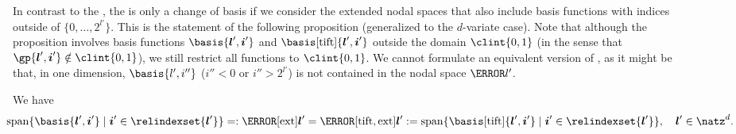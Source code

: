 In contrast to the \hftr, the \tiftr is only a change of basis
if we consider the extended nodal spaces that also include
basis functions with indices outside of $\{0, \dotsc, 2^{l'}\}$.
This is the statement of the following proposition
(generalized to the $d$-variate case).
Note that although the proposition involves basis functions
$\basis{\*l',\*i'}$ and $\basis[\tift]{\*l',\*i'}$
outside the domain $\clint{0, 1}$
(in the sense that $\gp{\*l',\*i'} \notin \clint{0, 1}$),
we still restrict all functions to $\clint{0, 1}$.
We cannot formulate an equivalent version of ,
as it might be that, in one dimension,
$\basis{l',i''}$ ($i'' < 0$ or $i'' > 2^{l'}$)
is not contained in the nodal space $\ns{l'}$.

\begin{proposition}
  \label{prop:tiftNodalSpace}
  We have
  \begin{equation}
    \hspace*{-10mm}
    \spn\{\basis{\*l',\*i'} \mid \*i' \in \relindexset{\*l'}\}
    =: \ns[\ext]{\*l'}
    = \ns[\tift,\ext]{\*l'}
    := \spn\{\basis[\tift]{\*l',\*i'} \mid \*i' \in \relindexset{\*l'}\},\quad
    \*l' \in \natz^d.
    \hspace*{-20mm}
  \end{equation}
\end{proposition}

